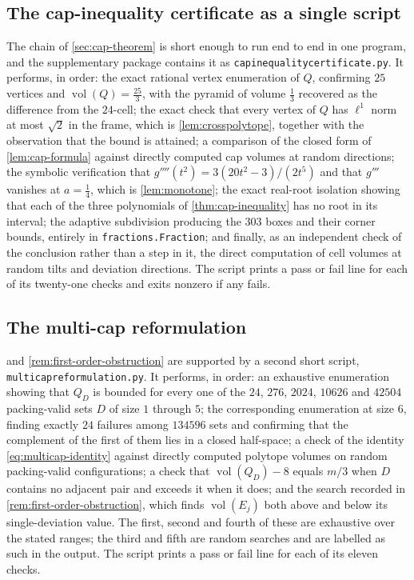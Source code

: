 \documentclass[11pt,reqno]{amsart}
\renewcommand{\_}{\origunderscore\allowbreak}
\numberwithin{equation}{section}
\theoremstyle{plain}
\theoremstyle{definition}
\theoremstyle{remark}
\DeclareMathOperator{\vol}{vol}
\begin{document}
\subsection*{The cap-inequality certificate as a single script}

The chain of \cref{sec:cap-theorem} is short enough to run end to end in
one program, and the supplementary package contains it as
\texttt{cap\_inequality\_certificate.py}. It performs, in order: the
exact rational vertex enumeration of $Q$, confirming $25$ vertices and
$\vol(Q)=\tfrac{25}{3}$, with the pyramid of volume $\tfrac13$ recovered
as the difference from the $24$-cell; the exact check that every vertex
of $Q$ has $\ell^1$ norm at most $\sqrt2$ in the frame, which is
\cref{lem:crosspolytope}, together with the observation that the bound is
attained; a comparison of the closed form of \cref{lem:cap-formula}
against directly computed cap volumes at random directions; the symbolic
verification that $g''''(t^2)=3(20t^2-3)/(2t^5)$ and that $g'''$ vanishes
at $a=\tfrac14$, which is \cref{lem:monotone}; the exact real-root
isolation showing that each of the three polynomials of
\cref{thm:cap-inequality} has no root in its interval; the adaptive
subdivision producing the $303$ boxes and their corner bounds, entirely
in \texttt{fractions.Fraction}; and finally, as an independent check of
the conclusion rather than a step in it, the direct computation of cell
volumes at random tilts and deviation directions. The script prints a
pass or fail line for each of its twenty-one checks and exits nonzero if
any fails.

\subsection*{The multi-cap reformulation}

 and \cref{rem:first-order-obstruction} are
supported by a second short script,
\texttt{multi\_cap\_reformulation.py}. It performs, in order: an
exhaustive enumeration showing that $Q_D$ is bounded for every one of
the $24$, $276$, $2024$, $10626$ and $42504$ packing-valid sets $D$ of
size $1$ through $5$; the corresponding enumeration at size $6$, finding
exactly $24$ failures among $134596$ sets and confirming that the
complement of the first of them lies in a closed half-space; a check of
the identity \eqref{eq:multicap-identity} against directly computed
polytope volumes on random packing-valid configurations; a check that
$\vol(Q_D)-8$ equals $m/3$ when $D$ contains no adjacent pair and
exceeds it when it does; and the search recorded in
\cref{rem:first-order-obstruction}, which finds $\vol(E_j)$ both above
and below its single-deviation value. The first, second and fourth of
these are exhaustive over the stated ranges; the third and fifth are
random searches and are labelled as such in the output. The script
prints a pass or fail line for each of its eleven checks.
\end{document}
